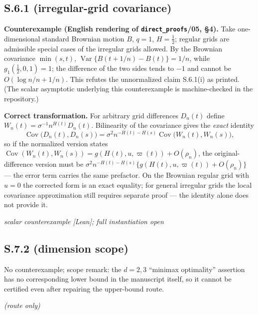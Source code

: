 \documentclass[11pt]{article}
\theoremstyle{definition}
\theoremstyle{remark}
\newcommand{\statustag}[1]{%
  \par\nobreak\begingroup\footnotesize\itshape\raggedleft #1\par\endgroup}
\newcommand{\Wlean}{[Lean]}
\newcommand{\Wwritten}{[written]}
\begin{document}
\smallskip{}

\subsection{S.6.1 (irregular-grid covariance)}
\textbf{Counterexample (English rendering of \texttt{direct\_proofs}/05,
\S4).} Take one-dimensional standard Brownian motion $B$, $q=1$,
$H=\tfrac12$; regular grids are admissible special cases of the irregular
grids allowed. By the Brownian covariance $\min(s,t)$,
$\operatorname{Var}\{B(t+1/n)-B(t)\}=1/n$, while
$g_1(\tfrac12,0,1)=1$; the difference of the two sides tends to $-1$ and
cannot be $O(\log n/n+1/n)$. This refutes the unnormalized claim S.6.1(i)
as printed. (The scalar asymptotic underlying this counterexample is
machine-checked in the repository.)

\textbf{Correct transformation.} For arbitrary grid differences
$D_n(t)$ define $W_n(t)=\sigma^{-1}n^{H(t)}D_n(t)$. Bilinearity of the
covariance gives the \emph{exact} identity
\[
\operatorname{Cov}\bigl(D_n(t),D_n(s)\bigr)
=\sigma^{2}n^{-H(t)-H(s)}
\operatorname{Cov}\bigl(W_n(t),W_n(s)\bigr),
\]
so if the normalized version states
$\operatorname{Cov}(W_n(t),W_n(s))=g(H(t),u,\varpi(t))+O(\rho_n)$, the
original-difference version must be
$\sigma^{2}n^{-H(t)-H(s)}\{g(H(t),u,\varpi(t))+O(\rho_n)\}$ --- the error
term carries the same prefactor. On the Brownian regular grid with $u=0$
the corrected form is an exact equality; for general irregular grids the
local covariance approximation still requires separate proof --- the
identity alone does not provide it.
\statustag{scalar counterexample \Wlean; full instantiation open}

\smallskip{}

\subsection{S.7.2 (dimension scope)}
No counterexample; scope remark: the $d=2,3$ ``minimax optimality'' assertion
has no corresponding lower bound in the manuscript itself, so it cannot be
certified even after repairing the upper-bound route.
\statustag{\Wwritten (route only)}

\smallskip{}
\end{document}
